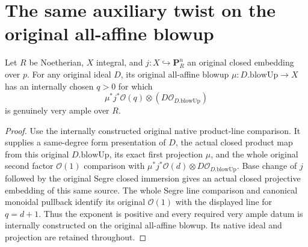 \section{The same auxiliary twist on the original all-affine blowup}

\begin{theorem}
\label{thm:pl-original-native-blowup-tautological-very-ample}
\leanok
{}
Let $R$ be Noetherian, $X$ integral, and
$j:X\hookrightarrow\mathbf P_R^n$ an original closed embedding
over $p$. For any original ideal $D$, its original all-affine
blowup $\mu:D.\mathrm{blowUp}\to X$ has an internally chosen
$q>0$ for which
\[
 \mu^*j^*\mathcal O(q)\otimes(D\mathcal O_{D.\mathrm{blowUp}})
\]
is genuinely very ample over $R$.
\end{theorem}
\begin{proof}
\leanok
Use the internally constructed original native product-line
comparison. It supplies a same-degree form presentation of $D$,
the actual closed product map from this original $D.\mathrm{blowUp}$,
its exact first projection $\mu$, and the whole original second
factor $\mathcal O(1)$ comparison with
$\mu^*j^*\mathcal O(d)\otimes D\mathcal O_{D.\mathrm{blowUp}}$.
Base change of $j$ followed by the original Segre closed immersion
gives an actual closed projective embedding of this same source.
The whole Segre line comparison and canonical monoidal pullback
identify its original $\mathcal O(1)$ with the displayed line for
$q=d+1$. Thus the exponent is positive and every required very
ample datum is internally constructed on the original all-affine
blowup. Its native ideal and projection are retained throughout.
\end{proof}
